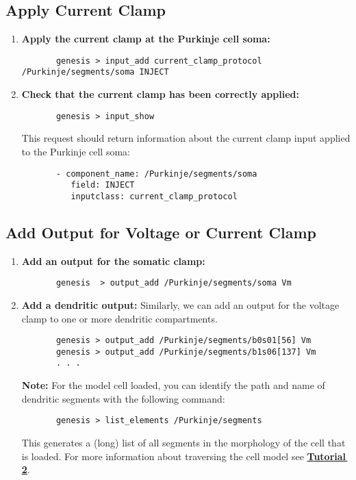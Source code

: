 \documentclass[12pt]{article}
\begin{document}
\subsection*{Apply Current Clamp}

\begin{enumerate}	
	\item{\bf Apply the current clamp at the Purkinje cell soma:}
	\begin{verbatim}
	   genesis > input_add current_clamp_protocol /Purkinje/segments/soma INJECT
	\end{verbatim}
	
	\item{\bf Check that the current clamp has been correctly applied:}
	\begin{verbatim}
	   genesis > input_show
	\end{verbatim}
	This request should return information about the current clamp input applied to the Purkinje cell soma:
	\begin{verbatim}
	   - component_name: /Purkinje/segments/soma
	      field: INJECT
	      inputclass: current_clamp_protocol
	   \end{verbatim}
\end{enumerate}

\subsection*{Add Output for Voltage or Current Clamp}

\begin{enumerate}
	\item{\bf Add an output for the somatic clamp:}
	\begin{verbatim}
	   genesis  > output_add /Purkinje/segments/soma Vm
	\end{verbatim}
	
	\item{\bf Add a dendritic output:} Similarly, we can add an output for the voltage clamp to one or more dendritic compartments.
	\begin{verbatim}
	   genesis > output_add /Purkinje/segments/b0s01[56] Vm
	   genesis > output_add /Purkinje/segments/b1s06[137] Vm
	   . . .
	\end{verbatim}
	{\bf Note:} For the model cell loaded, you can identify the path and name of dendritic segments with the following command:
	\begin{verbatim}
	   genesis > list_elements /Purkinje/segments
	\end{verbatim}	
	This generates a (long) list of all segments in the morphology of the cell that is loaded. For more information about traversing the cell model see \href{../tutorial2/tutorial2.tex}{\bf Tutorial\,2}.
\end{enumerate}
\end{document}
